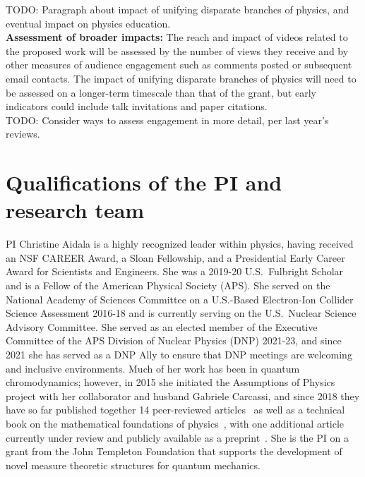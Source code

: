 TODO: Paragraph about impact of unifying disparate branches of physics, and eventual impact on physics education.\\

\noindent
\textbf{Assessment of broader impacts:}  The reach and impact of videos related to the proposed work will be assessed by the number of views they receive and by other measures of audience engagement such as comments posted or subsequent email contacts.  The impact of unifying disparate branches of physics will need to be assessed on a longer-term timescale than that of the grant, but early indicators could include talk invitations and paper citations. \\
TODO: Consider ways to assess engagement in more detail, per last year's reviews.


\section{Qualifications of the PI and research team}
PI Christine Aidala is a highly recognized leader within physics, having received an NSF CAREER Award, a Sloan Fellowship, and a Presidential Early Career Award for Scientists and Engineers. She was a 2019-20 U.S.~Fulbright Scholar and is a Fellow of the American Physical Society (APS).  She served on the National Academy of Sciences Committee on a U.S.-Based Electron-Ion Collider Science Assessment 2016-18 and is currently serving on the U.S.~Nuclear Science Advisory Committee.  She served as an elected member of the Executive Committee of the APS Division of Nuclear Physics (DNP) 2021-23, and since 2021 she has served as a DNP Ally to ensure that DNP meetings are welcoming and inclusive environments.  Much of her work has been in quantum chromodynamics; however, in 2015 she initiated the Assumptions of Physics project with her collaborator and husband Gabriele Carcassi, and since 2018 they have so far published together 14 peer-reviewed articles~\cite{aop-phys-blueprint,aop-topExpDisting,aop-HamQuantInfo,Carcassi:2021,aop-spacetimeStruct,aop-HamConsInfoEnt,Carcassi2021four,Carcassi:2022bpm,aop-HamPriv,aop-commonLogical,aop-action,aop-nogo,aop-nonaddmeas,aop-unphysHilbert} as well as a technical book on the mathematical foundations of physics~\cite{aop-book}, with one additional article currently under review and publicly available as a preprint~\cite{aop-classicallimit}.  She is the PI on a grant from the John Templeton Foundation that supports the development of novel measure theoretic structures for quantum mechanics. \\

